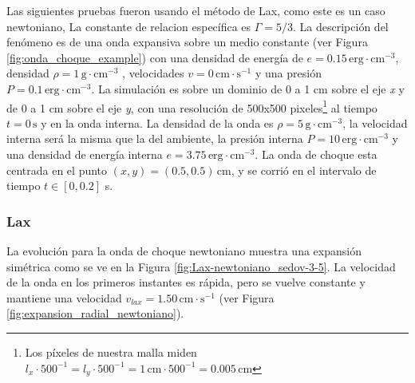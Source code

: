 \documentclass[12pt,a4paper]{book}
\begin{document}


Las siguientes pruebas fueron usando el método de Lax, como este es un caso newtoniano, La constante de relacion específica es $\Gamma = 5/3$. La descripción del fenómeno es de una onda expansiva sobre un medio constante (ver Figura \ref{fig:onda_choque_example}) 
con una densidad de energía de $e = 0.15 \, \mathrm{erg} \cdot \mathrm{cm}^{-3}$, densidad $\rho = 1 \, \mathrm{g} \cdot \mathrm{cm}^{-3}$ , velocidades $v = 0 \, \mathrm{cm} \cdot \mathrm{s}^{-1}$ y una presión $P=0.1 \, \mathrm{erg} \cdot \mathrm{cm}^{-3} $. La simulación es sobre un dominio de 0 a 1 cm sobre el eje \emph{x} y de 0 a 1 cm sobre el eje \emph{y}, con una resolución de 500x500 pixeles\footnote{Los píxeles de nuestra malla miden $l_x\cdot 500^{-1} = l_y\cdot 500^{-1}  = 1 \, \mathrm{cm} \cdot 500^{-1} = 0.005 \, \mathrm{cm}$} al tiempo $t=0 \, \mathrm{s}$  y en la onda interna. La densidad de la onda es $\rho=5 \, \mathrm{g} \cdot \mathrm{cm}^{-3}$, la velocidad interna será la misma que la del ambiente, la presión interna $P=10 \, \mathrm{erg} \cdot \mathrm{cm}^{-3} $ 
y una densidad de energía interna $e = 3.75 \, \mathrm{erg} \cdot \mathrm{cm}^{-3}$. La onda de choque esta centrada en el punto $(x,y) = (0.5, 0.5) \, \mathrm{cm}$, y se corrió en el intervalo de tiempo $t \in \left[ 0 , 0.2 \right]$ s.
\subsubsection{Lax}
La evolución para la onda de choque newtoniano muestra una expansión simétrica como se ve en la Figura \ref{fig:Lax-newtoniano_sedov-3-5}. La velocidad de la onda en los primeros instantes es rápida, pero se vuelve constante y mantiene una velocidad $v_{lax} = 1.50 \, \mathrm{cm} \cdot \mathrm{s}^{-1}$ (ver Figura \ref{fig:expansion_radial_newtoniano}).
\end{document}
